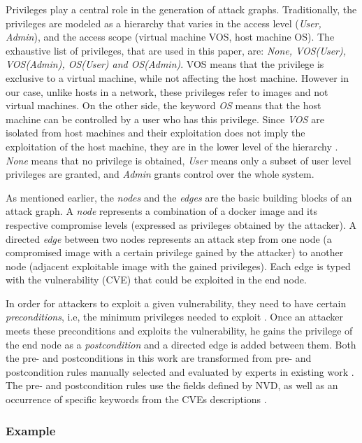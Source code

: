 Privileges play a central role in the generation of attack graphs. Traditionally, the privileges are modeled as a hierarchy that varies in the access level (\textit{User, Admin}), and the access scope (virtual machine VOS, host machine OS). The exhaustive list of privileges, that are used in this paper, are: \textit{None, VOS(User), VOS(Admin), OS(User) and OS(Admin)}. VOS means that the privilege is exclusive to a virtual machine, while not affecting the host machine. However in our case, unlike hosts in a network, these privileges refer to images and not virtual machines. On the other side, the keyword \textit{OS} means that the  host machine can be controlled by a user who has this privilege. Since \textit{VOS} are isolated from host machines and their exploitation does not imply the exploitation of the host machine, they are in the lower level of the hierarchy \cite{aksu2018automated}. \textit{None} means that no privilege is obtained, \textit{User} means only a subset of user level privileges are granted, and \textit{Admin} grants control over the whole system.

As mentioned earlier, the \textit{nodes} and the \textit{edges} are the basic building blocks of an attack graph. A \textit{node} represents  a combination of a docker image and its respective compromise levels (expressed as privileges obtained by the attacker). A directed \textit{edge} between two nodes represents an attack step from one node (a compromised image with a certain privilege gained by the attacker) to another node (adjacent exploitable image with the gained privileges). Each edge is typed with the vulnerability (CVE) that could be exploited in the end node.

In order for attackers to exploit a given vulnerability, they need to have certain \textit{preconditions}, i.e, the minimum privileges needed to exploit \cite{aksu2018automated}. Once an attacker meets these preconditions and exploits the vulnerability, he gains the privilege of the end node as a \textit{postcondition} and a directed edge is added between them. Both the pre- and postconditions in this work are transformed from pre- and postcondition rules manually selected and evaluated by experts in existing work \cite{aksu2018automated}. The pre- and postcondition rules use the fields defined by NVD, as well as an occurrence of specific keywords from the CVEs descriptions \cite{booth2013national}.

\subsubsection{Example}

